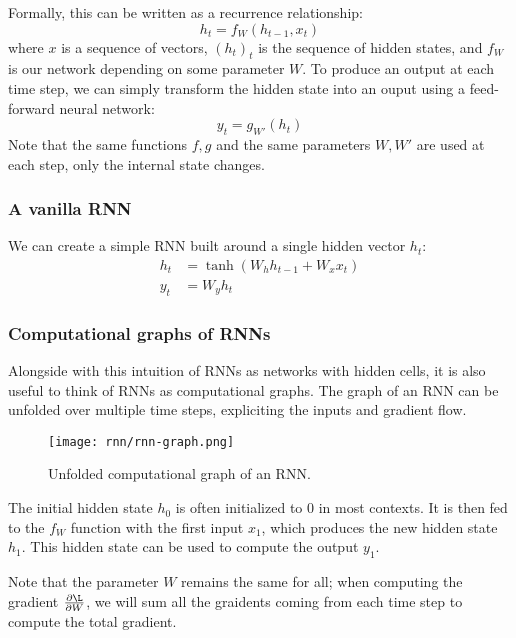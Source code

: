 Formally, this can be written as a recurrence relationship:
\begin{equation*}
    h_t = f_W(h_{t-1}, x_t)
\end{equation*}
where $x$ is a sequence of vectors, $(h_t)_t$ is the sequence of hidden states, and $f_W$ is our network depending on some parameter $W$. To produce an output at each time step, we can simply transform the hidden state into an ouput using a feed-forward neural network:
\begin{equation*}
    y_t = g_{W'}(h_t)
\end{equation*}
Note that the same functions $f, g$ and the same parameters $W, W'$ are used at each step, only the internal state changes.

\subsubsection{A vanilla RNN}
We can create a simple RNN built around a single hidden vector $h_t$:
\begin{equation*}
    \begin{aligned}
        h_t &= \tanh\left(W_h h_{t-1} + W_x x_t\right)\\
        y_t &= W_y h_t
    \end{aligned}
\end{equation*}

\subsubsection{Computational graphs of RNNs}
Alongside with this intuition of RNNs as networks with hidden cells, it is also useful to think of RNNs as computational graphs. The graph of an RNN can be unfolded over multiple time steps, expliciting the inputs and gradient flow.
\begin{figure}[H]
    \centering
    \texttt{[image: rnn/rnn-graph.png]}
    \caption{Unfolded computational graph of an RNN.}
\end{figure}
The initial hidden state $h_0$ is often initialized to 0 in most contexts. It is then fed to the $f_W$ function with the first input $x_1$, which produces the new hidden state $h_1$. This hidden state can be used to compute the output $y_1$.

Note that the parameter $W$ remains the same for all; when computing the gradient $\frac{\partial\L}{\partial W}$, we will sum all the graidents coming from each time step to compute the total gradient.

